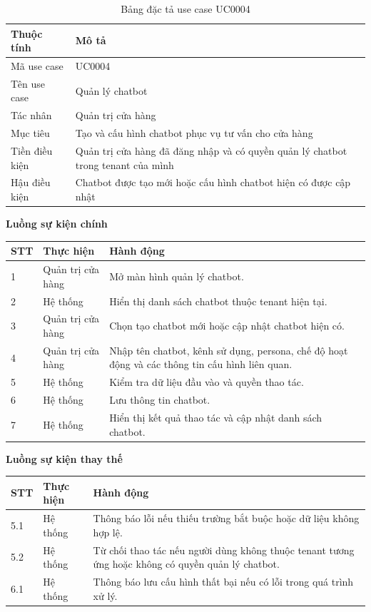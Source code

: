 \documentclass[../DoAn.tex]{subfiles}
\begin{document}
\begin{table}[H]
\centering
\caption{Bảng đặc tả use case UC0004}
\label{table:uc0004}
\begin{tabular}{|p{}|p{}|}
\hline
\textbf{Thuộc tính} & \textbf{Mô tả} \\
\hline
Mã use case & UC0004 \\
\hline
Tên use case & Quản lý chatbot \\
\hline
Tác nhân & Quản trị cửa hàng \\
\hline
Mục tiêu & Tạo và cấu hình chatbot phục vụ tư vấn cho cửa hàng \\
\hline
Tiền điều kiện & Quản trị cửa hàng đã đăng nhập và có quyền quản lý chatbot trong tenant của mình \\
\hline
Hậu điều kiện & Chatbot được tạo mới hoặc cấu hình chatbot hiện có được cập nhật \\
\hline
\end{tabular}
\end{table}

\textbf{Luồng sự kiện chính}

\begin{table}[H]
\centering
\begin{tabular}{|p{}|p{}|p{}|}
\hline
\textbf{STT} & \textbf{Thực hiện} & \textbf{Hành động} \\
\hline
1 & Quản trị cửa hàng & Mở màn hình quản lý chatbot. \\
\hline
2 & Hệ thống & Hiển thị danh sách chatbot thuộc tenant hiện tại. \\
\hline
3 & Quản trị cửa hàng & Chọn tạo chatbot mới hoặc cập nhật chatbot hiện có. \\
\hline
4 & Quản trị cửa hàng & Nhập tên chatbot, kênh sử dụng, persona, chế độ hoạt động và các thông tin cấu hình liên quan. \\
\hline
5 & Hệ thống & Kiểm tra dữ liệu đầu vào và quyền thao tác. \\
\hline
6 & Hệ thống & Lưu thông tin chatbot. \\
\hline
7 & Hệ thống & Hiển thị kết quả thao tác và cập nhật danh sách chatbot. \\
\hline
\end{tabular}
\end{table}

\textbf{Luồng sự kiện thay thế}

\begin{table}[H]
\centering
\begin{tabular}{|p{}|p{}|p{}|}
\hline
\textbf{STT} & \textbf{Thực hiện} & \textbf{Hành động} \\
\hline
5.1 & Hệ thống & Thông báo lỗi nếu thiếu trường bắt buộc hoặc dữ liệu không hợp lệ. \\
\hline
5.2 & Hệ thống & Từ chối thao tác nếu người dùng không thuộc tenant tương ứng hoặc không có quyền quản lý chatbot. \\
\hline
6.1 & Hệ thống & Thông báo lưu cấu hình thất bại nếu có lỗi trong quá trình xử lý. \\
\hline
\end{tabular}
\end{table}
\end{document}
